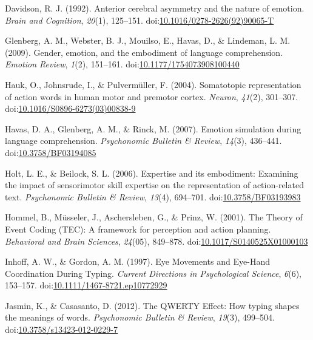 \documentclass[english,man]{apa6}
\theoremstyle{definition}
\theoremstyle{definition}
\theoremstyle{definition}
\theoremstyle{remark}
\begin{document}
\hypertarget{ref-Davidson1992}{}
Davidson, R. J. (1992). Anterior cerebral asymmetry and the nature of
emotion. \emph{Brain and Cognition}, \emph{20}(1), 125--151.
doi:\href{https://doi.org/10.1016/0278-2626(92)90065-T}{10.1016/0278-2626(92)90065-T}

\hypertarget{ref-Glenberg2009}{}
Glenberg, A. M., Webster, B. J., Mouilso, E., Havas, D., \& Lindeman, L.
M. (2009). Gender, emotion, and the embodiment of language
comprehension. \emph{Emotion Review}, \emph{1}(2), 151--161.
doi:\href{https://doi.org/10.1177/1754073908100440}{10.1177/1754073908100440}

\hypertarget{ref-Hauk2004}{}
Hauk, O., Johnsrude, I., \& Pulvermüller, F. (2004). Somatotopic
representation of action words in human motor and premotor cortex.
\emph{Neuron}, \emph{41}(2), 301--307.
doi:\href{https://doi.org/10.1016/S0896-6273(03)00838-9}{10.1016/S0896-6273(03)00838-9}

\hypertarget{ref-Havas2007}{}
Havas, D. A., Glenberg, A. M., \& Rinck, M. (2007). Emotion simulation
during language comprehension. \emph{Psychonomic Bulletin \& Review},
\emph{14}(3), 436--441.
doi:\href{https://doi.org/10.3758/BF03194085}{10.3758/BF03194085}

\hypertarget{ref-Holt2006}{}
Holt, L. E., \& Beilock, S. L. (2006). Expertise and its embodiment:
Examining the impact of sensorimotor skill expertise on the
representation of action-related text. \emph{Psychonomic Bulletin \&
Review}, \emph{13}(4), 694--701.
doi:\href{https://doi.org/10.3758/BF03193983}{10.3758/BF03193983}

\hypertarget{ref-Hommel2001}{}
Hommel, B., Müsseler, J., Aschersleben, G., \& Prinz, W. (2001). The
Theory of Event Coding (TEC): A framework for perception and action
planning. \emph{Behavioral and Brain Sciences}, \emph{24}(05), 849--878.
doi:\href{https://doi.org/10.1017/S0140525X01000103}{10.1017/S0140525X01000103}

\hypertarget{ref-Inhoff1997}{}
Inhoff, A. W., \& Gordon, A. M. (1997). Eye Movements and Eye-Hand
Coordination During Typing. \emph{Current Directions in Psychological
Science}, \emph{6}(6), 153--157.
doi:\href{https://doi.org/10.1111/1467-8721.ep10772929}{10.1111/1467-8721.ep10772929}

\hypertarget{ref-Jasmin2012}{}
Jasmin, K., \& Casasanto, D. (2012). The QWERTY Effect: How typing
shapes the meanings of words. \emph{Psychonomic Bulletin \& Review},
\emph{19}(3), 499--504.
doi:\href{https://doi.org/10.3758/s13423-012-0229-7}{10.3758/s13423-012-0229-7}
\end{document}
